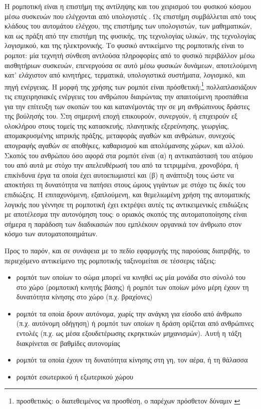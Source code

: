 Η ρομποτική είναι η επιστήμη της αντίληψης και του χειρισμού του φυσικού κόσμου
μέσω συσκευών που ελέγχονται από υπολογιστές \cite{thrun2005probabilistic}.  Ως
επιστήμη συμβάλλεται από τους κλάδους του αυτομάτου ελέγχου, της επιστήμης των
υπολογιστών, των μαθηματικών, και ως πράξη από την επιστήμη της φυσικής, της
τεχνολογίας υλικών, της τεχνολογίας λογισμικού, και της ηλεκτρονικής. Το φυσικό
αντικείμενο της ρομποτικής είναι το ρομποτ: μία τεχνητή σύνθεση αντλούσα
πληροφορίες από το φυσικό περιβάλλον μέσω αισθητήριων συσκευών, επενεργούσα σε
αυτό μέσω φυσικών δυνάμεων, αποτελούμενη κατ' ελάχιστον από κινητήρες,
τερματικά, υπολογιστικά συστήματα, λογισμικό, και πηγή ενέργειας. Η μορφή της
χρήσης των ρομπότ είναι πρόσθετική:\footnote{προσθετικός: ο διατεθειμένος να
προσθέση, ο παρέχων πρόσθετον δύναμιν \cite{liddell_scott}} πολλαπλασιάζουν τις
επιχειρησιακές ενέργειες του ανθρώπου διαιρώντας την απαιτούμενη προσπάθεια για
την επίτευξη των σκοπών του και κατανέμοντάς την σε μη ανθρώπινους δράστες της
βούλησής του.  Στη σημερινή εποχή επικουρούν, συνεργούν, ή επιχειρούν εξ
ολοκλήρου στους τομείς της κατασκευής, πλανητικής εξερεύνησης, γεωργίας,
απομακρυσμένης ιατρικής πράξης, μεταφοράς αγαθών και ανθρώπων, συνεχούς
απογραφής αγαθών σε αποθήκες, καθαρισμού και απολύμανσης χώρων, και αλλού.
Σκοπός του ανθρώπου όσο αφορά στα ρομπότ είναι (α) η αντικατάστασή του ατόμου
του από αυτά με στόχο την απελευθέρωσή του από τα τετριμμένα, χρονοβόρα, ή
επικίνδυνα έργα τα οποία έχει αυτοεπωμιστεί και (β) η ανάπτυξη τους ώστε να
αποκτήσει τη δυνατότητα να πατήσει στους ώμους γιγάντων με στόχο τις δικές του
επιδιώξεις. Η επιταχυνόμενη, εξαπλούμενη, και θεμελιωμένη χρήση της αυτοματικής
λογικής που γέννησε τη ρομποτική έχει εκτρέψει αυτές τις αντικειμενικές
επιδιώξεις με αποτέλεσμα την αυτονόμηση τους: ο οριακός σκοπός της
αυτοματοποίησης είναι σήμερα η παράδοση των διαδικασιών που εμπλέκουν οργανικά
τον άνθρωπο στον κόσμο των αυτοματοποιημάτων.

Προς το παρόν, και σε συνάφεια με το πεδίο εφαρμογής της παρούσας διατριβής,
το περιεχόμενο αντικείμενο της ρομποτικής ταξινομείται σε τέσσερις τάξεις:

\begin{itemize}
  \item ρομπότ των οποίων το σώμα μπορεί να κινηθεί ως μία μονάδα στο σύνολό
        του στο χώρο (ρομποτική κινητής βάσης) ή ρομπότ των οποίων μόνο μέρη
        έχουν τη δυνατότητα κίνησης στο χώρο (π.χ. βραχίονες)
  \item ρομπότ τα οποία δρουν αυτόνομα, χωρίς την ανάγκη για είσοδο από
        άνθρωπο (π.χ. αυτόνομη οδήγηση) ή ρομπότ των οποίων η δράση ορίζεται
        από ανθρώπινες εντολές (π.χ. ως μέσα εξουδετέρωσης εκρηκτικών
        μηχανισμών). Αυτή η τάξη διακρίνεται σε βαθμίδες αυτονομίας
        \cite{Beer2014}
  \item ρομπότ τα οποία έχουν τη δυνατότητα κίνησης στη γη, τον αέρα, ή τη
        θάλασσα
  \item ρομπότ εσωτερικού ή εξωτερικού χώρου
\end{itemize}


